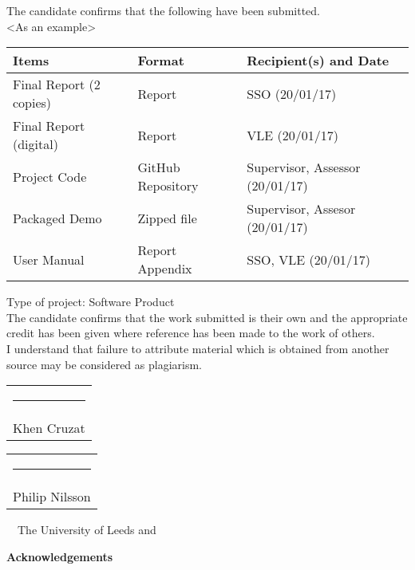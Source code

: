 \frontcover

\clearpage
\noindent The candidate confirms that the following have been submitted.\\
<As an example>
\begin{table}[ht!]
\begin{tabular}{|p{}|p{}|p{}|}
\hline 
Items & Format & Recipient(s) and Date \\ 
\hline 
Final Report (2 copies) & Report & SSO (20/01/17) \\ 
\hline 
Final Report (digital) & Report & VLE (20/01/17) \\ 
\hline 
Project Code & GitHub Repository & Supervisor, Assessor (20/01/17) \\ 
\hline 
Packaged Demo & Zipped file & Supervisor, Assesor (20/01/17) \\
\hline
User Manual & Report Appendix & SSO, VLE (20/01/17) \\ 
\hline 
\end{tabular} 
\end{table}

\noindent Type of project: Software Product
\vspace{\fill}\\
\noindent The candidate confirms that the work submitted is their own and the appropriate credit has been given where reference has been made to the work of others.
\vspace{\fill}\\
\noindent I understand that failure to attribute material which is obtained from another source may be considered as plagiarism.
\vspace{\fill}\\
\begin{tabular}[t]{@{}l} 
  \rule{50mm}{1pt}\\  Khen Cruzat
\end{tabular}
\hfill%
\begin{tabular}[t]{l@{}}
   \rule{50mm}{1pt}\\ Philip Nilsson
\end{tabular}
\flushleft 
\vspace{\fill}
\textcopyright~\session~The University of Leeds and~\fullname

\begin{dissertationsummary}

\end{dissertationsummary}

\clearpage
\centering\textbf{Acknowledgements}
\flushleft


\tableofcontents

